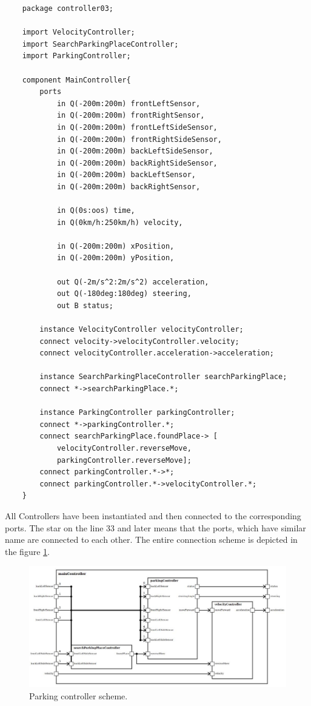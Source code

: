 \begin{lstlisting}
    package controller03;

    import VelocityController;
    import SearchParkingPlaceController;
    import ParkingController;
    
    component MainController{
        ports 
            in Q(-200m:200m) frontLeftSensor,
            in Q(-200m:200m) frontRightSensor,
            in Q(-200m:200m) frontLeftSideSensor,
            in Q(-200m:200m) frontRightSideSensor,
            in Q(-200m:200m) backLeftSideSensor,
            in Q(-200m:200m) backRightSideSensor,
            in Q(-200m:200m) backLeftSensor,
            in Q(-200m:200m) backRightSensor,
    
            in Q(0s:oos) time,
            in Q(0km/h:250km/h) velocity,
    
            in Q(-200m:200m) xPosition,
            in Q(-200m:200m) yPosition,
    
            out Q(-2m/s^2:2m/s^2) acceleration,
            out Q(-180deg:180deg) steering,
            out B status;
    
        instance VelocityController velocityController;
        connect velocity->velocityController.velocity;
        connect velocityController.acceleration->acceleration;
    
        instance SearchParkingPlaceController searchParkingPlace;
        connect *->searchParkingPlace.*;
        
        instance ParkingController parkingController;
        connect *->parkingController.*;
        connect searchParkingPlace.foundPlace-> [
            velocityController.reverseMove,
            parkingController.reverseMove];
        connect parkingController.*->*;
        connect parkingController.*->velocityController.*;
    }
\end{lstlisting}
\bigskip
All Controllers have been instantiated and then connected to the corresponding ports. The star on the line 33 and later means that the ports, which have similar name are connected to each other. The entire connection scheme is depicted in the figure \ref{fig:parking-scheme}.
\begin{figure}[h!]
    \centering
    \includegraphics[width=\linewidth]{src/pic/parking-scheme}
    \caption{Parking controller scheme.}
    \label{fig:parking-scheme}
\end{figure}
